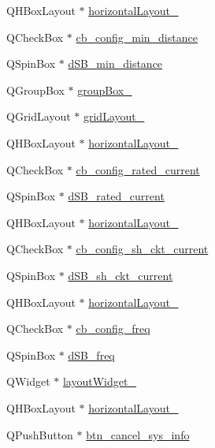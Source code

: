 \begin{DoxyCompactItemize}
\item 
Q\+H\+Box\+Layout $\ast$ \hyperlink{a00080_a8ead8fc876ee91c30864822eedb9c370}{horizontal\+Layout\+\_}
\item 
Q\+Check\+Box $\ast$ \hyperlink{a00080_a6b0d09f3b380fdb810d3da3f5208ccf5}{cb\+\_\+config\+\_\+min\+\_\+distance}
\item 
Q\+Spin\+Box $\ast$ \hyperlink{a00080_a01c23085590f4947828948bbd9f50cc7}{d\+S\+B\+\_\+min\+\_\+distance}
\item 
Q\+Group\+Box $\ast$ \hyperlink{a00080_a269faaef68e4ad4784635810fcae5698}{group\+Box\+\_}
\item 
Q\+Grid\+Layout $\ast$ \hyperlink{a00080_a20728ed83bf740332bd908ea3e15ace6}{grid\+Layout\+\_}
\item 
Q\+H\+Box\+Layout $\ast$ \hyperlink{a00080_ab48e49d68609b4c66e5169e2f87e3eb9}{horizontal\+Layout\+\_}
\item 
Q\+Check\+Box $\ast$ \hyperlink{a00080_af4863849ff58931ae3a38aa5b40b8158}{cb\+\_\+config\+\_\+rated\+\_\+current}
\item 
Q\+Spin\+Box $\ast$ \hyperlink{a00080_ab6d7c3a292c79cd73aff8735df48d30e}{d\+S\+B\+\_\+rated\+\_\+current}
\item 
Q\+H\+Box\+Layout $\ast$ \hyperlink{a00080_af1a7bbeee705545b94c55c297299118d}{horizontal\+Layout\+\_}
\item 
Q\+Check\+Box $\ast$ \hyperlink{a00080_a541de6e510677e572ab233f7ecc25e2c}{cb\+\_\+config\+\_\+sh\+\_\+ckt\+\_\+current}
\item 
Q\+Spin\+Box $\ast$ \hyperlink{a00080_aab5fcfd5ceedb9c4e853139113f5c753}{d\+S\+B\+\_\+sh\+\_\+ckt\+\_\+current}
\item 
Q\+H\+Box\+Layout $\ast$ \hyperlink{a00080_a9ab91d59aada4ff82309b36c9d5a0fa6}{horizontal\+Layout\+\_}
\item 
Q\+Check\+Box $\ast$ \hyperlink{a00080_a8f501acefacd6343a4ec99a67172f256}{cb\+\_\+config\+\_\+freq}
\item 
Q\+Spin\+Box $\ast$ \hyperlink{a00080_abd528de839feccc001dc62b3aecddc9f}{d\+S\+B\+\_\+freq}
\item 
Q\+Widget $\ast$ \hyperlink{a00080_a185129091df0a390d82417f2f52cb80f}{layout\+Widget\+\_}
\item 
Q\+H\+Box\+Layout $\ast$ \hyperlink{a00080_a488ae2286c0922552e7a39a756e337d3}{horizontal\+Layout\+\_}
\item 
Q\+Push\+Button $\ast$ \hyperlink{a00080_a72415fe77c8f6eb7b13d16177a14b39a}{btn\+\_\+cancel\+\_\+sys\+\_\+info}
\item 

\end{DoxyCompactItemize}
